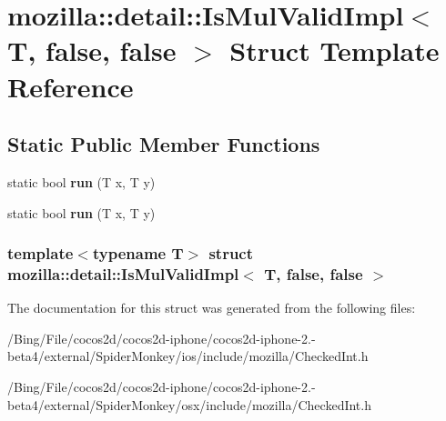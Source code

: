 \hypertarget{structmozilla_1_1detail_1_1_is_mul_valid_impl_3_01_t_00_01false_00_01false_01_4}{\section{mozilla\-:\-:detail\-:\-:Is\-Mul\-Valid\-Impl$<$ T, false, false $>$ Struct Template Reference}
\label{structmozilla_1_1detail_1_1_is_mul_valid_impl_3_01_t_00_01false_00_01false_01_4}
}
\subsection*{Static Public Member Functions}
\begin{DoxyCompactItemize}
\item 
\hypertarget{structmozilla_1_1detail_1_1_is_mul_valid_impl_3_01_t_00_01false_00_01false_01_4_a8c00dfc823337b6f8290c2fbcb9f0c37}{static bool {\bfseries run} (T x, T y)}\label{structmozilla_1_1detail_1_1_is_mul_valid_impl_3_01_t_00_01false_00_01false_01_4_a8c00dfc823337b6f8290c2fbcb9f0c37}

\item 
\hypertarget{structmozilla_1_1detail_1_1_is_mul_valid_impl_3_01_t_00_01false_00_01false_01_4_a8c00dfc823337b6f8290c2fbcb9f0c37}{static bool {\bfseries run} (T x, T y)}\label{structmozilla_1_1detail_1_1_is_mul_valid_impl_3_01_t_00_01false_00_01false_01_4_a8c00dfc823337b6f8290c2fbcb9f0c37}

\end{DoxyCompactItemize}
\subsubsection*{template$<$typename T$>$ struct mozilla\-::detail\-::\-Is\-Mul\-Valid\-Impl$<$ T, false, false $>$}



The documentation for this struct was generated from the following files\-:\begin{DoxyCompactItemize}
\item 
/\-Bing/\-File/cocos2d/cocos2d-\/iphone/cocos2d-\/iphone-\/2.-\/beta4/external/\-Spider\-Monkey/ios/include/mozilla/Checked\-Int.\-h\item 
/\-Bing/\-File/cocos2d/cocos2d-\/iphone/cocos2d-\/iphone-\/2.-\/beta4/external/\-Spider\-Monkey/osx/include/mozilla/Checked\-Int.\-h\end{DoxyCompactItemize}
